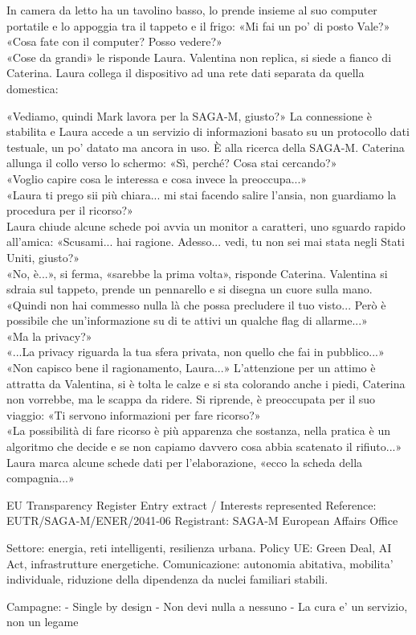 \documentclass[10pt,oneside]{extbook}
\begin{document}
In camera da letto ha un tavolino basso, lo prende insieme al suo computer  portatile e lo appoggia tra il tappeto e il frigo: «Mi fai un po' di posto Vale?»\\
«Cosa fate con il computer? Posso vedere?»\\
«Cose da grandi» le risponde Laura. Valentina non replica, si siede a fianco di Caterina. Laura collega il dispositivo ad una rete dati separata da quella domestica:

«Vediamo, quindi Mark lavora per la SAGA-M, giusto?» La connessione \`e stabilita e Laura accede a un servizio di informazioni basato su un protocollo dati testuale, un po' datato ma ancora in uso. \`E alla ricerca della SAGA-M. Caterina allunga il collo verso lo schermo:
«Sì, perch\'e? Cosa stai cercando?»\\

«Voglio capire cosa le interessa e cosa invece la preoccupa...»\\
«Laura ti prego sii pi\`u chiara... mi stai facendo salire l'ansia, non guardiamo la procedura per il ricorso?»\\
Laura chiude alcune schede poi avvia un monitor a caratteri, uno sguardo rapido all'amica: «Scusami... hai ragione. Adesso... vedi, tu non sei mai stata negli Stati Uniti, giusto?»\\
«No, \`e...», si ferma, «sarebbe la prima volta», risponde Caterina. Valentina si sdraia sul tappeto, prende un pennarello e si disegna un cuore sulla mano.\\
«Quindi non hai commesso nulla l\`a che possa precludere il tuo visto... Però \`e possibile che un'informazione su di te attivi un qualche flag di allarme...»\\
«Ma la privacy?»\\
«...La privacy riguarda la tua sfera privata, non quello che fai in pubblico...»\\
«Non capisco bene il ragionamento, Laura...» L'attenzione per un attimo \`e attratta da Valentina, si \`e tolta le calze e si sta colorando anche i piedi, Caterina non vorrebbe, ma le scappa da ridere. Si riprende, \`e preoccupata per il suo viaggio: «Ti servono informazioni per fare ricorso?»\\
«La possibilità di fare ricorso \`e pi\`u apparenza che sostanza, nella pratica \`e un algoritmo che decide e se non capiamo davvero cosa abbia scatenato il rifiuto...»
Laura marca alcune schede dati per l'elaborazione, «ecco la scheda della compagnia...»\\
\begin{terminalbox}
EU Transparency Register
Entry extract / Interests represented
Reference: EUTR/SAGA-M/ENER/2041-06
Registrant: SAGA-M European Affairs Office

Settore: energia, reti intelligenti,
resilienza urbana.
Policy UE: Green Deal, AI Act,
infrastrutture energetiche.
Comunicazione: autonomia abitativa, mobilita' individuale,
riduzione della dipendenza da nuclei
familiari stabili.

Campagne:
- Single by design
- Non devi nulla a nessuno
- La cura e' un servizio, non un legame
\end{terminalbox}
\end{document}
